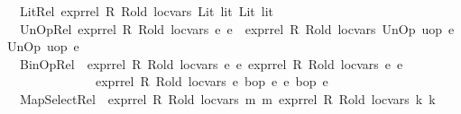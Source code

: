 \begin{isabellebody}
\ {\isacharbar}{\kern0pt}\ Lit{\isacharunderscore}{\kern0pt}Rel{\isacharcolon}{\kern0pt}\ {\isachardoublequoteopen}expr{\isacharunderscore}{\kern0pt}rel\ R\ R{\isacharunderscore}{\kern0pt}old\ loc{\isacharunderscore}{\kern0pt}vars\ {\isacharparenleft}{\kern0pt}Lit\ lit{\isacharparenright}{\kern0pt}\ {\isacharparenleft}{\kern0pt}Lit\ lit{\isacharparenright}{\kern0pt}{\isachardoublequoteclose}\isanewline
\ {\isacharbar}{\kern0pt}\ UnOp{\isacharunderscore}{\kern0pt}Rel{\isacharcolon}{\kern0pt}\ {\isachardoublequoteopen}expr{\isacharunderscore}{\kern0pt}rel\ R\ R{\isacharunderscore}{\kern0pt}old\ loc{\isacharunderscore}{\kern0pt}vars\ e{}\ e{}\ {\isasymLongrightarrow}\ expr{\isacharunderscore}{\kern0pt}rel\ R\ R{\isacharunderscore}{\kern0pt}old\ loc{\isacharunderscore}{\kern0pt}vars\ {\isacharparenleft}{\kern0pt}UnOp\ uop\ e{}{\isacharparenright}{\kern0pt}\ {\isacharparenleft}{\kern0pt}UnOp\ uop\ e{}{\isacharparenright}{\kern0pt}{\isachardoublequoteclose}\isanewline
\ {\isacharbar}{\kern0pt}\ BinOp{\isacharunderscore}{\kern0pt}Rel{\isacharcolon}{\kern0pt}\ {\isachardoublequoteopen}{\isasymlbrakk}\ expr{\isacharunderscore}{\kern0pt}rel\ R\ R{\isacharunderscore}{\kern0pt}old\ loc{\isacharunderscore}{\kern0pt}vars\ e{}{}\ e{}{}{\isacharsemicolon}{\kern0pt}\ expr{\isacharunderscore}{\kern0pt}rel\ R\ R{\isacharunderscore}{\kern0pt}old\ loc{\isacharunderscore}{\kern0pt}vars\ e{}{}\ e{}{}\ {\isasymrbrakk}\ {\isasymLongrightarrow}\ \isanewline
\ \ \ \ \ \ \ \ \ \ \ \ \ \ expr{\isacharunderscore}{\kern0pt}rel\ R\ R{\isacharunderscore}{\kern0pt}old\ loc{\isacharunderscore}{\kern0pt}vars\ {\isacharparenleft}{\kern0pt}e{}{}\ {\isasymguillemotleft}bop{\isasymguillemotright}\ e{}{}{\isacharparenright}{\kern0pt}\ {\isacharparenleft}{\kern0pt}e{}{}\ {\isasymguillemotleft}bop{\isasymguillemotright}\ e{}{}{\isacharparenright}{\kern0pt}{\isachardoublequoteclose}\isanewline
\ {\isacharbar}{\kern0pt}\ MapSelect{\isacharunderscore}{\kern0pt}Rel{\isacharcolon}{\kern0pt}\ {\isachardoublequoteopen}{\isasymlbrakk}\ expr{\isacharunderscore}{\kern0pt}rel\ R\ R{\isacharunderscore}{\kern0pt}old\ loc{\isacharunderscore}{\kern0pt}vars\ m\ m{\isacharprime}{\kern0pt}{\isacharsemicolon}{\kern0pt}\ expr{\isacharunderscore}{\kern0pt}rel\ R\ R{\isacharunderscore}{\kern0pt}old\ loc{\isacharunderscore}{\kern0pt}vars\ k\ k{\isacharprime}{\kern0pt}\ {\isasymrbrakk}\ {\isasymLongrightarrow}\ \isanewline

\end{isabellebody}
